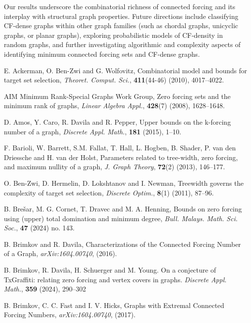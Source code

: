 \documentclass[11pt]{article}
\theoremstyle{definition}
\newcommand{\1}{\vspace{0.1cm}}
\newcommand{\2}{\vspace{0.2cm}}
\newcommand{\3}{\vspace{0.3cm}}
\begin{document}
Our results underscore the combinatorial richness of connected forcing and its interplay with structural graph properties. Future directions include classifying CF-dense graphs within other graph families (such as chordal graphs, unicyclic graphs, or planar graphs), exploring probabilistic models of CF-density in random graphs, and further investigating algorithmic and complexity aspects of identifying minimum connected forcing sets and CF-dense graphs.

\medskip
\begin{thebibliography}{99}

E. Ackerman, O. Ben-Zwi and G. Wolfovitz,
Combinatorial model and bounds for target set selection,
\emph{Theoret. Comput. Sci.}, {\bf 411}(44-46)
(2010), 4017--4022.

 AIM Minimum Rank-Special Graphs Work Group, Zero forcing sets and the minimum rank of graphs, \textit{Linear Algebra Appl.}, \textbf{428}(7) (2008), 1628--1648.

 D. Amos, Y. Caro, R. Davila and R. Pepper, Upper bounds on the k-forcing number of a graph, \emph{Discrete Appl. Math.}, \textbf{181} (2015), 1--10.

F. Barioli,  W. Barrett, S.M. Fallat, T. Hall, L. Hogben, B. Shader, P. van den Driessche and H. van der Holst,
Parameters related to tree-width, zero forcing, and maximum nullity of a graph,
\emph{J. Graph Theory}, \textbf{72}(2) (2013),
146--177.

O. Ben-Zwi, D. Hermelin, D. Lokshtanov and I. Newman,
Treewidth governs the complexity of target set selection, 
\emph{Discrete Optim.}, \textbf{8}(1) (2011),
87--96.

 B. Brešar, M. G. Cornet, T. Dravec and M. A. Henning, Bounds on zero forcing using (upper) total domination and minimum degree, \emph{Bull. Malays. Math. Sci. Soc.}, \textbf{47} (2024) no. 143.

 B. Brimkov and R. Davila, Characterizations of the Connected Forcing Number of a Graph, \emph{arXiv:1604.00740}, (2016).

 B. Brimkov, R. Davila, H. Schuerger and M. Young.  On a conjecture of TxGraffiti: relating zero forcing and vertex covers in graphs. \emph{Discrete Appl. Math.}, {\bf 359} (2024), 290--302

B. Brimkov, C. C. Fast and I. V. Hicks, Graphs with Extremal Connected Forcing Numbers, \emph{arXiv:1604.00740}, (2017).


\end{thebibliography}
\end{document}
